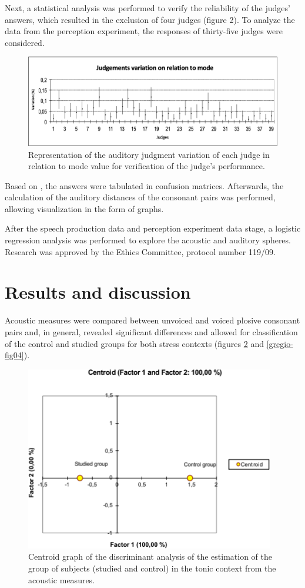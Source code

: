 Next, a statistical analysis was performed to verify the reliability of the
judges' answers, which resulted in the exclusion of four judges (figure 2). To
analyze the data from the perception experiment, the responses of thirty-five
judges were considered.

\begin{figure}
\centering
\includegraphics[width=\linewidth]{imgs/gregio-image2.png}
\caption{Representation of the auditory judgment variation of each judge in relation to mode value for verification of the judge's performance.} 
\label{gregio-fig02}
\end{figure}

Based on \citet{johnson2003}, the answers were tabulated in confusion matrices.
Afterwards, the calculation of the auditory distances of the consonant pairs
was performed, allowing visualization in the form of graphs.

After the speech production data and perception experiment data stage, a
logistic regression analysis was performed to explore the acoustic and auditory
spheres. Research was approved by the Ethics Committee, protocol number 119/09.


\section{Results and discussion}
Acoustic measures were compared between unvoiced and voiced plosive consonant
pairs and, in general, revealed significant differences and allowed for
classification of the control and studied groups for both stress contexts
(figures \ref{gregio-fig03} and \ref{gregio-fig04}).

\begin{figure}
\centering
\includegraphics[width=0.7\linewidth]{imgs/gregio-image3.png}
\caption{Centroid graph of the discriminant analysis of the estimation of the group of subjects (studied and control) in the tonic context from the acoustic measures.} 
\label{gregio-fig03}
\end{figure}

